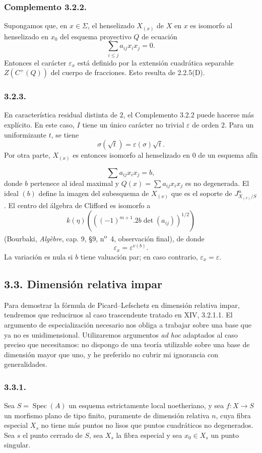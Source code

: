 \subsubsection*{Complemento 3.2.2.}
Supongamos que, en $x\in\Sigma$, el henselizado $X_{(x)}$ de $X$ en
$x$ es isomorfo al henselizado en $x_0$ del esquema proyectivo $Q$ de
ecuación
\[
\sum_{i\leq j}a_{ij}x_ix_j=0.
\]
Entonces el carácter $\varepsilon_x$ está definido por la extensión
cuadrática separable $Z(C^+(Q))$ del cuerpo de fracciones. Esto resulta
de 2.2.5(D).

\subsubsection*{3.2.3.}
En característica residual distinta de $2$, el Complemento 3.2.2 puede
hacerse más explícito. En este caso, $I$ tiene un único carácter no
trivial $\varepsilon$ de orden $2$. Para un uniformizante $t$, se tiene
\[
\sigma(\sqrt t)=\varepsilon(\sigma)\sqrt t.
\]
Por otra parte, $X_{(x)}$ es entonces isomorfo al henselizado en $0$ de
un esquema afín

\pageoriginale

\[
\sum a_{ij}x_ix_j=b,
\]
donde $b$ pertenece al ideal maximal y
$Q(x)=\sum a_{ij}x_ix_j$ es no degenerada. El ideal $(b)$ define la
imagen del subesquema de $X_{(x)}$ que es el soporte de
$J^n_{X_{(x)}/S}$. El centro del álgebra de Clifford es isomorfo a
\[
k(\eta)\left(\left((-1)^{m+1}.2b\det(a_{ij})\right)^{1/2}\right)
\]
(Bourbaki, \emph{Alg\`ebre}, cap. 9, \S9,
n\textsuperscript{o}~4, observación final), de donde
\[
\varepsilon_x=\varepsilon^{v(b)}.
\]
La variación es nula si $b$ tiene valuación par; en caso contrario,
$\varepsilon_x=\varepsilon$.

\subsection*{3.3. Dimensión relativa impar}

Para demostrar la fórmula de Picard--Lefschetz en dimensión relativa
impar, tendremos que reducirnos al caso trascendente tratado en XIV,
3.2.1.1. El argumento de especialización necesario nos obliga a trabajar
sobre una base que ya no es unidimensional. Utilizaremos argumentos
\emph{ad hoc} adaptados al caso preciso que necesitamos: no dispongo de
una teoría utilizable sobre una base de dimensión mayor que uno, y he
preferido no cubrir mi ignorancia con generalidades.

\subsubsection*{3.3.1.}
Sea $S=\operatorname{Spec}(A)$ un esquema estrictamente local
noetheriano, y sea $f:X\to S$ un morfismo plano de tipo finito,
puramente de dimensión relativa $n$, cuya fibra especial $X_s$ no tiene
más puntos no lisos que puntos cuadráticos no degenerados. Sea $s$ el
punto cerrado de $S$, sea $X_s$ la fibra especial y sea
$x_0\in X_s$ un punto singular.

